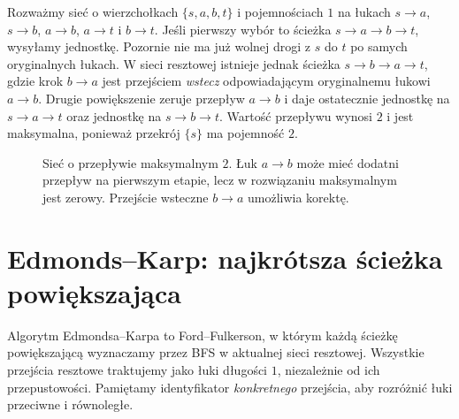 \begin{przyklad}
\label{ex:tg-flow-cancel}
Rozważmy sieć o wierzchołkach $\{s,a,b,t\}$
i pojemnościach $1$ na łukach
$s\to a$, $s\to b$, $a\to b$, $a\to t$ i $b\to t$.
Jeśli pierwszy wybór to ścieżka
$s\to a\to b\to t$, wysyłamy jednostkę.
Pozornie nie ma już wolnej drogi z $s$ do $t$
po samych oryginalnych łukach.
W sieci resztowej istnieje jednak ścieżka
$s\to b\to a\to t$,
gdzie krok $b\to a$ jest przejściem
\emph{wstecz} odpowiadającym oryginalnemu
łukowi $a\to b$. Drugie powiększenie zeruje
przepływ $a\to b$ i daje ostatecznie
jednostkę na $s\to a\to t$
oraz jednostkę na $s\to b\to t$.
Wartość przepływu wynosi $2$ i jest maksymalna,
ponieważ przekrój $\{s\}$ ma pojemność $2$.
\end{przyklad}

\begin{figure}[htbp]
\centering
{}
\caption{Sieć o przepływie maksymalnym $2$.
Łuk $a\to b$ może mieć dodatni przepływ na pierwszym
etapie, lecz w rozwiązaniu maksymalnym jest zerowy.
Przejście wsteczne $b\to a$ umożliwia korektę.}
\label{fig:tg-flow-backward}
\end{figure}

\section{Edmonds--Karp: najkrótsza ścieżka powiększająca}
\label{sec:tg-flow-ek}

Algorytm Edmondsa--Karpa to Ford--Fulkerson,
w którym każdą ścieżkę powiększającą wyznaczamy
przez BFS w aktualnej sieci resztowej.
Wszystkie przejścia resztowe traktujemy
jako łuki długości $1$, niezależnie
od ich przepustowości. Pamiętamy
identyfikator \emph{konkretnego} przejścia,
aby rozróżnić łuki przeciwne i równoległe.

